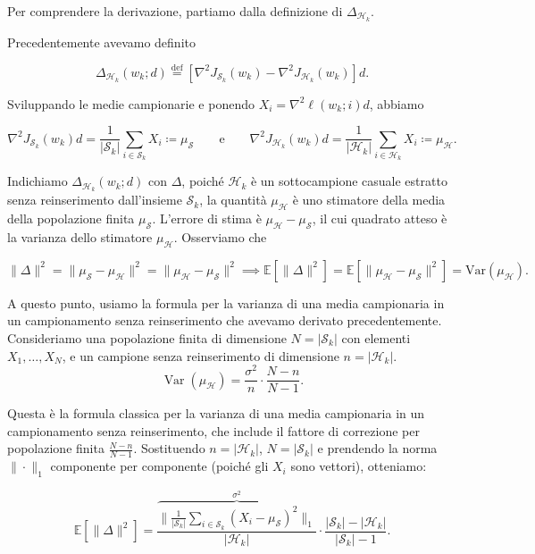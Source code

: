 \documentclass[a4paper,12pt]{article}
\numberwithin{equation}{section}
\numberwithin{figure}{section}
\numberwithin{table}{section}
\begin{document}
Per comprendere la derivazione, partiamo dalla definizione di \(\Delta_{\mathcal{H}_k}\).

Precedentemente avevamo definito

\[
\Delta_{\mathcal{H}_k}(w_k;d) \stackrel{\mathrm{def}}{=} \left[\nabla^2 J_{\mathcal{S}_k}(w_k) - \nabla^2 J_{\mathcal{H}_k}(w_k)\right]d.
\]

Sviluppando le medie campionarie e ponendo \(X_i = \nabla^2 \ell(w_k;i)d\), abbiamo

\[
\nabla^2 J_{\mathcal{S}_k}(w_k)d = \frac{1}{|\mathcal{S}_k|}\sum_{i\in \mathcal{S}_k} X_i
\coloneqq\mu_{\mathcal{S}}\qquad\text{e}\qquad
\nabla^2 J_{\mathcal{H}_k}(w_k)d = \frac{1}{|\mathcal{H}_k|}\sum_{i\in \mathcal{H}_k} X_i\coloneqq \mu_{\mathcal{H}} .
\]

Indichiamo $\Delta_{\mathcal{H}_k}(w_k;d)$ con $\Delta$, poiché \(\mathcal{H}_k\) è un sottocampione casuale estratto senza reinserimento dall'insieme \(\mathcal{S}_k\), la quantità \(\mu_{\mathcal{H}}\) è uno stimatore della media della popolazione finita \(\mu_{\mathcal{S}}\). L'errore di stima è \(\mu_{\mathcal{H}} - \mu_{\mathcal{S}}\), il cui quadrato atteso è la varianza dello stimatore \(\mu_{\mathcal{H}}\). Osserviamo che

\[
\|\Delta\|^2 = \|\mu_{\mathcal{S}} - \mu_{\mathcal{H}}\|^2 = \|\mu_{\mathcal{H}} - \mu_{\mathcal{S}}\|^2 \implies
\mathbb{E}[\|\Delta\|^2] = \mathbb{E}[\|\mu_{\mathcal{H}} - \mu_{\mathcal{S}}\|^2] = \mathrm{Var}(\mu_{\mathcal{H}}).
\]

A questo punto, usiamo la formula per la varianza di una media campionaria in un campionamento senza reinserimento che avevamo derivato precedentemente. Consideriamo una popolazione finita di dimensione \(N = |\mathcal{S}_k|\) con elementi \(X_1, \dots, X_N\), e un campione senza reinserimento di dimensione \(n = |\mathcal{H}_k|\).
\[
\operatorname{Var}(\mu_{\mathcal{H}})
= \frac{\sigma^2}{n} \cdot \frac{N-n}{N-1}.
\]

Questa è la formula classica per la varianza di una media campionaria in un campionamento senza reinserimento, che include il fattore di correzione per popolazione finita \(\frac{N-n}{N-1}\). Sostituendo \(n = |\mathcal{H}_k|\), \(N = |\mathcal{S}_k|\) e prendendo la norma \(\|\cdot\|_1\) componente per componente (poiché gli \(X_i\) sono vettori), otteniamo:

\[
\mathbb{E}[\|\Delta\|^2] = 
\frac{\overbrace{\|\frac{1}{|\mathcal{S}_k|}\sum_{i\in\mathcal{S}_k} (X_i - \mu_{\mathcal{S}})^2\|_1}^{\sigma^2}}{|\mathcal{H}_k|}
\cdot
\frac{|\mathcal{S}_k|-|\mathcal{H}_k|}{|\mathcal{S}_k|-1}.
\]
\end{document}
